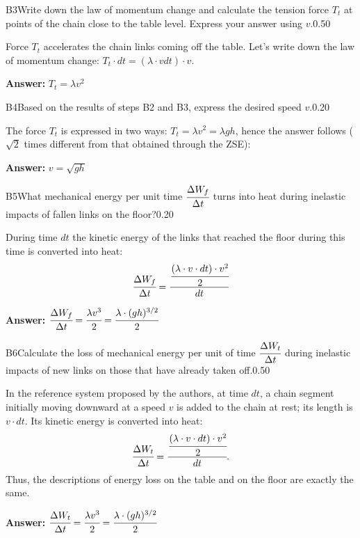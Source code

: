 \documentclass[11pt,a4paper]{article}
\begin{document}
\begin{solcard}{B3}{Write down the law of momentum change and calculate the tension force $T_t$ at points of the chain close to the table level. Express your answer using $v$.}{0.50}

Force $T_t$ accelerates the chain links coming off the table. Let's write down the law of momentum change: $T_t \cdot dt = (\lambda \cdot v dt) \cdot v$.

\par\smallskip\noindent\textbf{Answer:} $T_t = \lambda v^2$
\end{solcard}

\begin{solcard}{B4}{Based on the results of steps B2 and B3, express the desired speed $v$.}{0.20}

The force $T_t$ is expressed in two ways: $T_t = \lambda v^2 = \lambda gh$, hence the answer follows ($\sqrt2$ times different from that obtained through the ZSE):

\par\smallskip\noindent\textbf{Answer:} $v=\sqrt{gh}$
\end{solcard}

\begin{solcard}{B5}{What mechanical energy per unit time $\cfrac{\Delta W_f}{\Delta t}$ turns into heat during inelastic impacts of fallen links on the floor?}{0.20}

During time $dt$ the kinetic energy of the links that reached the floor during this time is converted into heat: $$\cfrac{\Delta W_f}{\Delta t} = \cfrac{\cfrac{(\lambda \cdot v \cdot dt) \cdot v^2}{2}}{dt}$$

\par\smallskip\noindent\textbf{Answer:} $\cfrac{\Delta W_f}{\Delta t} = \cfrac {\lambda v^3}{2} = \cfrac {\lambda \cdot (gh)^{3/2}}{2}$
\end{solcard}

\begin{solcard}{B6}{Calculate the loss of mechanical energy per unit of time $\cfrac{\Delta W_t}{\Delta t}$ during inelastic impacts of new links on those that have already taken off.}{0.50}

In the reference system proposed by the authors, at time $dt$, a chain segment initially moving downward at a speed $v$ is added to the chain at rest; its length is $v \cdot dt$. Its kinetic energy is converted into heat: $$\cfrac{\Delta W_t}{\Delta t} = \cfrac{\cfrac{(\lambda \cdot v \cdot dt) \cdot v^2}{2}}{dt}.$$ Thus, the descriptions of energy loss on the table and on the floor are exactly the same.

\par\smallskip\noindent\textbf{Answer:} $\cfrac{\Delta W_t}{\Delta t} = \cfrac {\lambda v^3}{2} = \cfrac {\lambda \cdot (gh)^{3/2}}{2}$
\end{solcard}
\end{document}
